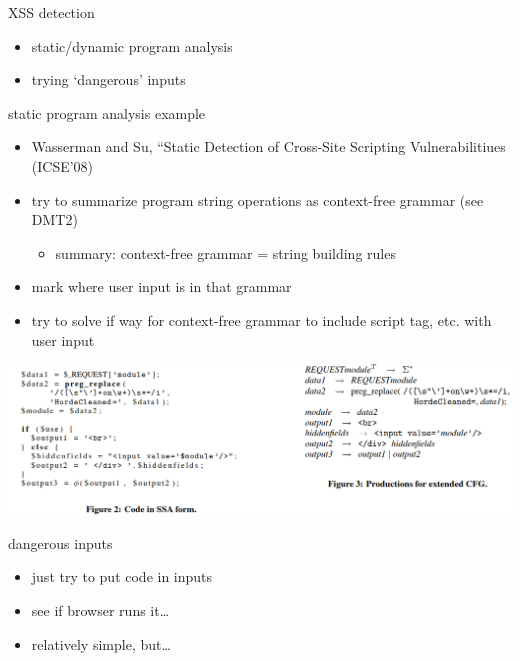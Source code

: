 \begin{frame}{XSS detection}
    \begin{itemize}
    \item static/dynamic program analysis
    \item trying `dangerous' inputs
    \end{itemize}
\end{frame}

\begin{frame}{static program analysis example}
    \begin{itemize}
    \item Wasserman and Su, ``Static Detection of Cross-Site Scripting Vulnerabilitiues (ICSE'08)
    \item try to summarize program string operations as context-free grammar (see DMT2)
        \begin{itemize}
        \item summary: context-free grammar = string building rules
        \end{itemize}
    \item mark where user input is in that grammar
    \item try to solve if way for context-free grammar to include script tag, etc. with user input
    \end{itemize}
\end{frame}

\begin{frame}
\includegraphics[width=\textwidth]{../web/wassermann-fig1-2}
\end{frame}

\begin{frame}{dangerous inputs}
    \begin{itemize}
    \item just try to put code in inputs
    \item see if browser runs it\ldots
    \vspace{.5cm}
    \item relatively simple, but\ldots
    \end{itemize}
\end{frame}

